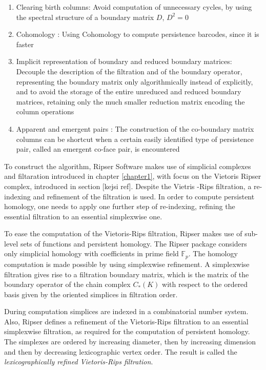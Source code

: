 \documentclass[11pt,a4paper]{report}
\begin{document}
            \begin{enumerate}
             \item Clearing birth columns:
             Avoid computation of unnecessary cycles, by using the spectral structure of a boundary matrix $D$, $D^2 = 0$
             \item Cohomology :
             Using Cohomology to compute persistence barcodes, since it is faster
             \item Implicit representation of boundary and reduced boundary matrices:
              Decouple the description of the filtration and of the boundary operator, representing the boundary matrix only algorithmically
                instead of explicitly, and to avoid the storage of the entire unreduced and reduced boundary matrices, retaining
                only the much smaller reduction matrix encoding the column operations
            \item Apparent and emergent pairs :
            The construction of the co-boundary matrix columns can be shortcut when a
            certain easily identified type of persistence pair, called an emergent co-face pair, is encountered
            \end{enumerate}

            To construct the algorithm, Ripser Software makes use of simplicial complexes and filtaration introduced in chapter \ref{chapter1}, with focus on the Vietoris Ripser complex, introduced in
            section [kejsi ref]. Despite the Vietris -Rips filtration, a re-indexing and refinement of the filtration is used. In order to compute persistent homology, one needs to apply one further step of
            re-indexing, refining the essential filtration to an essential simplexwise one.

            To ease the computation of the Vietoris-Rips filtration, Ripser makes use of sub-level sets of functions and persistent homology. The Ripser package considers only simplicial homology with
            coefficients in prime field $\mathbb{F}_p$. The homology computation is made possible by using simplexwise refinement. A simplexwise filtration gives rise to a filtration boundary matrix,
            which is the matrix of the boundary operator of the chain complex $C_*(K)$ with respect to the ordered basis given by the oriented simplices in filtration order.

            During computation simplices are indexed in a combinatorial number system. Also, Ripser defines a refinement of the Vietoris-Rips filtration to an essential simplexwise filtration, as required for the computation of persistent homology. The simplexes are ordered by increasing diameter, then by increasing dimension and then by decreasing lexicographic vertex order. The result is called the
            \emph{lexicographically refined Vietoris-Rips filtration}.
\end{document}
